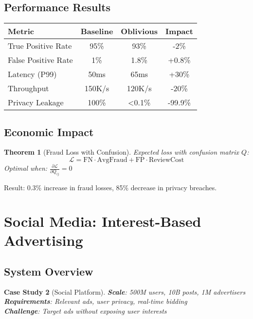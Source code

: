 \documentclass[11pt,final]{article}
\newtheorem{theorem}{Theorem}[section]
\newtheorem{casestudy}[theorem]{Case Study}
\begin{document}
\subsection{Performance Results}

\begin{center}
\begin{tabular}{lccc}
\toprule
\textbf{Metric} & \textbf{Baseline} & \textbf{Oblivious} & \textbf{Impact} \\
\midrule
True Positive Rate & 95\% & 93\% & -2\% \\
False Positive Rate & 1\% & 1.8\% & +0.8\% \\
Latency (P99) & 50ms & 65ms & +30\% \\
Throughput & 150K/s & 120K/s & -20\% \\
Privacy Leakage & 100\% & <0.1\% & -99.9\% \\
\bottomrule
\end{tabular}
\end{center}

\subsection{Economic Impact}

\begin{theorem}[Fraud Loss with Confusion]
Expected loss with confusion matrix $Q$:
\begin{equation}
\mathcal{L} = \text{FN} \cdot \text{AvgFraud} + \text{FP} \cdot \text{ReviewCost}
\end{equation}
Optimal when: $\frac{\partial \mathcal{L}}{\partial Q_{ij}} = 0$
\end{theorem}

Result: 0.3\% increase in fraud losses, 85\% decrease in privacy breaches.

\section{Social Media: Interest-Based Advertising}

\subsection{System Overview}

\begin{casestudy}[Social Platform]
\textbf{Scale}: 500M users, 10B posts, 1M advertisers\\
\textbf{Requirements}: Relevant ads, user privacy, real-time bidding\\
\textbf{Challenge}: Target ads without exposing user interests
\end{casestudy}
\end{document}
